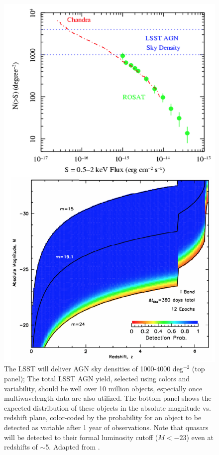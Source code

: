 \begin{figure}
\includegraphics[width=1.0\hsize,clip]{panels3.png}
\caption{The LSST will deliver AGN sky densities of 1000-4000 deg$^{-2}$ (top panel);
The total LSST AGN yield, selected using colors and variability, should be well over
10 million objects, especially once multiwavelength data are also utilized.
The bottom panel shows the expected distribution of these objects in the
absolute magnitude vs. redshift plane, color-coded by the probability for
an object to be
detected as variable after 1 year of observations. Note that quasars will
be detected to their formal luminosity cutoff ($M< -23$) even at redshifts
of $\sim$5. Adapted from \cite{2007AAS...21113709B}.}
\label{Fig:panels3}
\end{figure}

